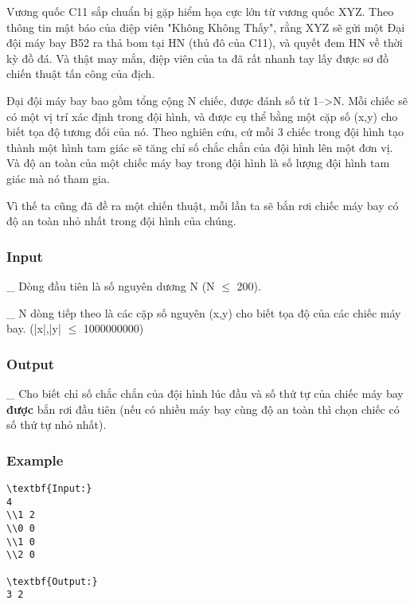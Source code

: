



   Vương quốc C11 sắp chuẩn bị gặp hiểm họa cực lớn từ vương quốc XYZ. Theo thông tin mật báo của điệp viên "Không Không Thấy", rằng XYZ sẽ gửi một Đại đội máy bay B52 ra thả bom tại HN (thủ đô của C11), và quyết đem HN về thời kỳ đồ đá. Và thật may mắn, điệp viên của ta đã rất nhanh tay lấy được sơ đồ chiến thuật tấn công của địch.  

   Đại đội máy bay bao gồm tổng cộng N chiếc, được đánh số từ 1-->N. Mỗi chiếc sẽ có một vị trí xác định trong đội hình, và được cụ thể bằng một cặp số (x,y) cho biết tọa độ tương đối của nó. Theo nghiên cứu, cứ mỗi 3 chiếc trong đội hình tạo thành một hình tam giác sẽ tăng chỉ số chắc chắn của đội hình lên một đơn vị. Và độ an toàn của một chiếc máy bay trong đội hình là số lượng đội hình tam giác mà nó tham gia.  

   Vì thế ta cũng đã đề ra một chiến thuật, mỗi lần ta sẽ bắn rơi chiếc máy bay có độ an toàn nhỏ nhất trong đội hình của chúng.  

\subsubsection{   Input  }

   \_ Dòng đầu tiên là số nguyên dương N (N $\le$ 200).  

   \_ N dòng tiếp theo là các cặp số nguyên (x,y) cho biết tọa độ của các chiếc máy bay. (|x|,|y| $\le$ 1000000000)  

\subsubsection{   Output  }

   \_ Cho biết   chỉ số chắc chắn   của đội hình lúc đầu và số thứ tự của chiếc máy bay   \textbf{    được   }bắn rơi đầu tiên   (nếu có nhiều máy bay cùng độ an toàn thì chọn chiếc có số thứ tự nhỏ nhất).  

\subsubsection{   Example  }
\begin{verbatim}
\textbf{Input:}
4
\\1 2
\\0 0 
\\1 0
\\2 0

\textbf{Output:}
3 2
\end{verbatim}
